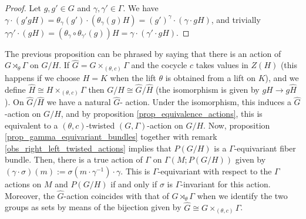 \begin{proof}
    Let \(g,g'\in G\) and \(\gamma, \gamma'\in \Gamma\). We have \(\gamma\cdot (g'g H)=\theta_\gamma(g')\cdot (\theta_{\gamma}(g) H)=(g')^\gamma\cdot (\gamma \cdot gH)\), and trivially \(\gamma\gamma'\cdot (gH)=(\theta_{\gamma}\circ  \theta_{\gamma'}(g)) H=\gamma \cdot (\gamma' \cdot gH)\).
\end{proof}
The previous proposition can be phrased by saying that there is an action of \(G \rtimes_\theta \Gamma\) on \(G/H\). If \(\hat{G}=G \times_{(\theta, c)}\Gamma\) and the cocycle \(c\) takes values in \(Z(H)\) (this happens if we choose \(H=K\) when the lift \(\theta\) is obtained from a lift on \(K\)), and we define \(\hat{H}\cong H \times_{(\theta, c)} \Gamma\) then \(G/H \cong \hat{G}/\hat{H}\) (the isomorphism is given by \(gH \to g\hat{H}\)). On \(\hat{G}/\hat{H}\) we have a natural \(\hat{G}\)- action. Under the isomorphism, this induces a \(\hat{G}\)-action on \(G/H\), and by proposition \ref{prop_equivalence_actions}, this is equivalent to a \((\theta, c)\)-twisted \((G, \Gamma)\)-action on \(G/H\). Now, proposition \ref{prop_gamma_equivariant_bundles} together with remark \ref{obs_right_left_twisted_actions} implies that \(P(G/H)\) is a \(\Gamma\)-equivariant fiber bundle. Then, there is a true action of \(\Gamma\) on \(\Gamma(M; P(G/H))\) given by \((\gamma\cdot \sigma)(m):=\sigma(m\cdot \gamma^{-1})\cdot \gamma\). This is \(\Gamma\)-equivariant with respect to the \(\Gamma\) actions on \(M\) and \(P(G/H)\) if and only if \(\sigma\) is \(\Gamma\)-invariant for this action. Moreover, the \(\hat{G}\)-action coincides with that of \(G \rtimes_\theta \Gamma\) when we identify the two groups as sets by means of the bijection given by \(\hat{G}\cong G \times_{(\theta, c)}\Gamma\).

